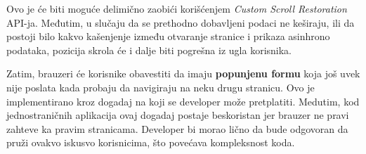 Ovo je će biti moguće delimično zaobići korišćenjem \textit{Custom Scroll Restoration} API-ja.
Međutim, u slučaju da se prethodno dobavljeni podaci ne keširaju, ili da postoji bilo kakvo kašenjenje između otvaranje stranice i prikaza asinhrono podataka, pozicija skrola će i dalje biti pogrešna iz ugla korisnika.

Zatim, brauzeri će korisnike obavestiti da imaju \textbf{popunjenu formu} koja još uvek nije poslata kada probaju da navigiraju na neku drugu stranicu.
Ovo je implementirano kroz dogadaj  na koji se developer može pretplatiti.
Medutim, kod jednostraničnih aplikacija ovaj dogadaj postaje beskoristan jer brauzer ne pravi zahteve ka pravim stranicama.
Developer bi morao lično da bude odgovoran da pruži ovakvo iskusvo korisnicima, što povećava kompleksnost koda.
